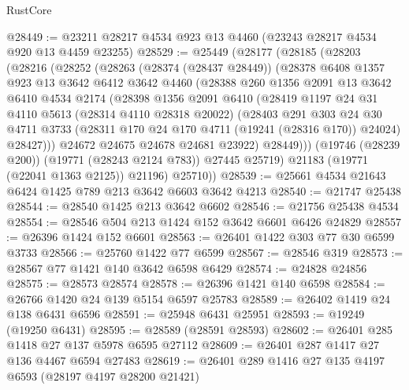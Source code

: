 \begin{lexlean}{RustCore}
\begin{coremodule}
@28449 := @23211 @28217 @4534 @923 @13 @4460 (@23243 @28217 @4534 @920 @13 @4459 @23255)
@28529 := @25449
    (@28177
      (@28185
        (@28203
          (@28216
            (@28252
              (@28263
                (@28374 (@28437 @28449))
                (@28378
                  @6408
                  @1357
                  @923
                  @13
                  @3642
                  @6412
                  @3642
                  @4460
                  (@28388
                    @260
                    @1356
                    @2091
                    @13
                    @3642
                    @6410
                    @4534
                    @2174
                    (@28398
                      @1356
                      @2091
                      @6410
                      (@28419
                        @1197
                        @24
                        @31
                        @4110
                        @5613
                        (@28314 @4110 @28318 @20022)
                        (@28403
                          @291
                          @303
                          @24
                          @30
                          @4711
                          @3733
                          (@28311 @170 @24 @170 @4711 (@19241 (@28316 @170)) @24024)
                          @28427)))
                    @24672
                    @24675
                    @24678
                    @24681
                    @23922)
                  @28449)))
            (@19746 (@28239 @200))
            (@19771 (@28243 @2124 @783))
            @27445
            @25719)
          @21183
          (@19771 (@22041 @1363 @2125))
          @21196)
        @25710))
@28539 := @25661 @4534 @21643 @6424 @1425 @789 @213 @3642 @6603 @3642 @4213
@28540 := @21747 @25438
@28544 := @28540 @1425 @213 @3642 @6602
@28546 := @21756 @25438 @4534
@28554 := @28546 @504 @213 @1424 @152 @3642 @6601 @6426 @24829
@28557 := @26396 @1424 @152 @6601
@28563 := @26401 @1422 @303 @77 @30 @6599 @3733
@28566 := @25760 @1422 @77 @6599
@28567 := @28546 @319
@28573 := @28567 @77 @1421 @140 @3642 @6598 @6429
@28574 := @24828 @24856
@28575 := @28573 @28574
@28578 := @26396 @1421 @140 @6598
@28584 := @26766 @1420 @24 @139 @5154 @6597 @25783
@28589 := @26402 @1419 @24 @138 @6431 @6596
@28591 := @25948 @6431 @25951
@28593 := @19249 (@19250 @6431)
@28595 := @28589 (@28591 @28593)
@28602 := @26401 @285 @1418 @27 @137 @5978 @6595 @27112
@28609 := @26401 @287 @1417 @27 @136 @4467 @6594 @27483
@28619 := @26401 @289 @1416 @27 @135 @4197 @6593 (@28197 @4197 @28200 @21421)

\end{coremodule}
\end{lexlean}
